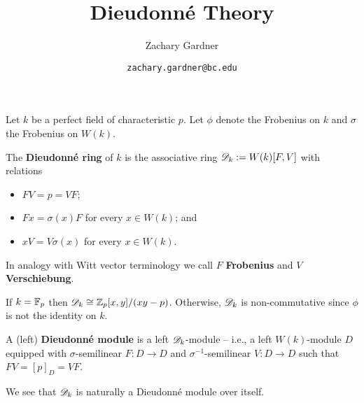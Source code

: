 \documentclass[11pt]{article}
\newcommand{\D}{\ms{D}}
\begin{document}
\title{Dieudonn\'{e} Theory}
\author{Zachary Gardner}
\date{\texttt{zachary.gardner@bc.edu}}
\maketitle


Let $k$ be a perfect field of characteristic $p$. Let $\phi$ denote the Frobenius on $k$ and $\sigma$ the Frobenius on $W(k)$.

\begin{definition}
The \textbf{Dieudonn\'{e} ring} of $k$ is the associative ring $\D_k:=W(k)[F,V]$ with relations
\begin{itemize}
\item $FV=p=VF$;
\item $Fx=\sigma(x)F$ for every $x\in W(k)$; and
\item $xV=V\sigma(x)$ for every $x\in W(k)$.
\end{itemize}
In analogy with Witt vector terminology we call $F$ \textbf{Frobenius} and $V$ \textbf{Verschiebung}.
\end{definition}

If $k=\mathbb{F}_p$ then $\D_k\iso\Z_p[x,y]/(xy-p)$. Otherwise, $\D_k$ is non-commutative since $\phi$ is not the identity on $k$.

\begin{definition}
A (left) \textbf{Dieudonn\'{e} module} is a left $\D_k$-module -- i.e., a left $W(k)$-module $D$ equipped with $\sigma$-semilinear $F: D\to D$ and $\sigma^{-1}$-semilinear $V: D\to D$ such that $FV=[p]_D=VF$.
\end{definition}

We see that $\D_k$ is naturally a Dieudonn\'{e} module over itself. 
\end{document}
